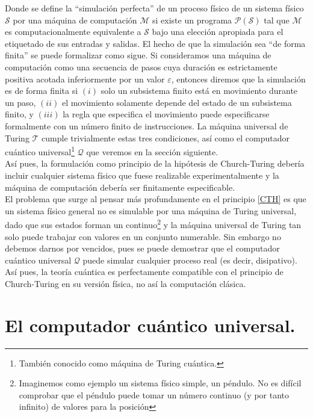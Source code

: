Donde se define la ``simulación perfecta'' de un proceso físico de un sistema físico $\mathcal{S}$ por una máquina de computación $\mathcal{M}$ si existe un programa $\mathcal{P}(\mathcal{S})$ tal que $\mathcal{M}$ es computacionalmente equivalente a $\mathcal{S}$ bajo una elección apropiada para el etiquetado de sus entradas y salidas. El hecho de que la simulación sea ``de forma finita'' se puede formalizar como sigue. Si consideramos una máquina de computación como una secuencia de pasos cuya duración es estrictamente positiva acotada inferiormente por un valor $\varepsilon$, entonces diremos que la simulación es de forma finita si $(i)$ solo un subsistema finito está en movimiento durante un paso, $(ii)$ el movimiento solamente depende del estado de un subsistema finito, y $(iii)$ la regla que especifica el movimiento puede especificarse formalmente con un número finito de instrucciones. La máquina universal de Turing $\mathcal{T}$ cumple trivialmente estas tres condiciones, así como el computador cuántico universal\footnote{También conocido como máquina de Turing cuántica.} $\mathcal{Q}$ que veremos en la sección siguiente. \\

Así pues, la formulación como principio de la hipótesis de Church-Turing debería incluir cualquier sistema físico que fuese realizable experimentalmente y la máquina de computación debería ser finitamente especificable.\\

El problema que surge al pensar más profundamente en el principio \ref{CTH} es que un sistema físico general no es simulable por una máquina de Turing universal, dado que sus estados forman un continuo\footnote{Imaginemos como ejemplo un sistema físico simple, un péndulo. No es difícil comprobar que el péndulo puede tomar un número continuo (y por tanto infinito) de valores para la posición} y la máquina universal de Turing tan solo puede trabajar con valores en un conjunto numerable. Sin embargo no debemos darnos por vencidos, pues se puede demostrar que el computador cuántico universal $\mathcal{Q}$ puede simular cualquier proceso real (es decir, disipativo). Así pues, la teoría cuántica es perfectamente compatible con el principio de Church-Turing en su versión física, no así la computación clásica.

\section{El computador cuántico universal.}

